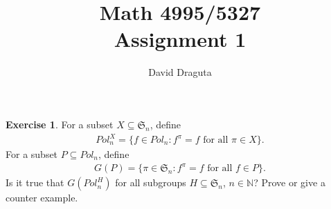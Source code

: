 \documentclass[12pt]{extarticle}
\title{ Math 4995/5327
  \\
  Assignment 1}
\author{David Draguta}
\newcommand{\set}[1]{\{#1\}}
\newcommand{\N}{\mathbb{N}}
\newcommand{\<}{\langle}
\renewcommand{\>}{\rangle}
\theoremstyle{definition}
\newtheorem{exercise}{Exercise}
\begin{document}
\maketitle

\begin{exercise}
  For a subset $X \subseteq \mathfrak{S}_n$, define
  \begin{align*}
    Pol_n^{X} = \set{f \in Pol_n: f^{\pi} = f \text{ for all } \pi \in X}.
  \end{align*}
  For a subset $P \subseteq Pol_n$, define
  \begin{align*}
    G(P) = \set{\pi \in \mathfrak{S}_n: f^{\pi} = f \text{ for all } f \in P}.
  \end{align*}
  Is it true that $G(Pol_n^H)$ for all subgroups $H \subseteq \mathfrak{S}_n$, $n \in \N$? Prove or give a counter example. 
\end{exercise}
\end{document}
